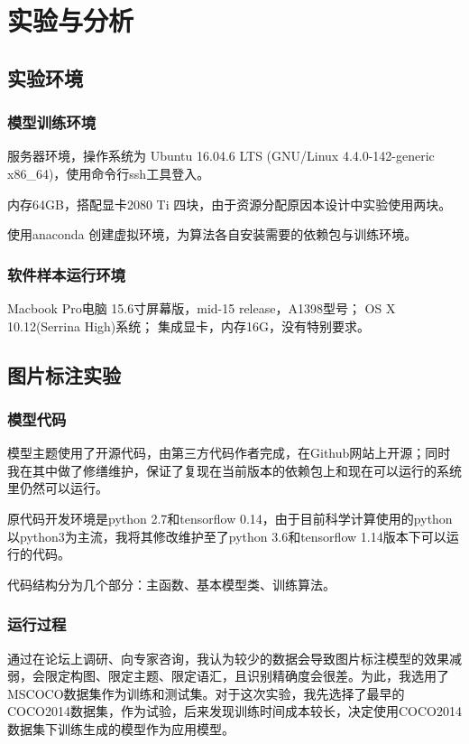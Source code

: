 
\chapter{实验与分析}
\section{实验环境}
\subsection{模型训练环境}
服务器环境，操作系统为
Ubuntu 16.04.6 LTS (GNU/Linux 4.4.0-142-generic x86\_64)，使用命令行ssh工具登入。

内存64GB，搭配显卡2080 Ti 四块，由于资源分配原因本设计中实验使用两块。

使用anaconda 创建虚拟环境，为算法各自安装需要的依赖包与训练环境。
\subsection{软件样本运行环境}
Macbook Pro电脑 15.6寸屏幕版，mid-15 release，A1398型号；
OS X 10.12(Serrina High)系统；
集成显卡，内存16G，没有特别要求。

\section{图片标注实验}
\subsection{模型代码}
模型主题使用了开源代码，由第三方代码作者完成，在Github网站上开源；同时我在其中做了修缮维护，保证了复现在当前版本的依赖包上和现在可以运行的系统里仍然可以运行。

原代码开发环境是python 2.7和tensorflow 0.14，由于目前科学计算使用的python以python3为主流，我将其修改维护至了python 3.6和tensorflow 1.14版本下可以运行的代码。

代码结构分为几个部分：主函数、基本模型类、训练算法。
\subsection{运行过程}
通过在论坛上调研、向专家咨询，我认为较少的数据会导致图片标注模型的效果减弱，会限定构图、限定主题、限定语汇，且识别精确度会很差。为此，我选用了MSCOCO数据集作为训练和测试集。对于这次实验，我先选择了最早的COCO2014数据集，作为试验，后来发现训练时间成本较长，决定使用COCO2014数据集下训练生成的模型作为应用模型。

